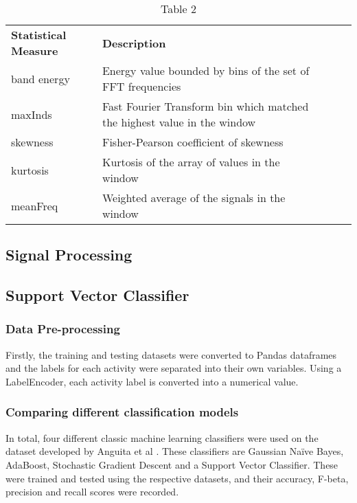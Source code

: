     \begin{table}[ht]
        \begin{tabular}{|l|l|lll}
            \cline{1-2}
            \textbf{Statistical Measure} & \textbf{Description} &  &  &  \\ \cline{1-2}
            band energy            & Energy value bounded by bins of the set of FFT frequencies           &  &  & \\ \cline{1-2}
            maxInds             & Fast Fourier Transform bin which matched the highest value in the window          &  &  &  \\ \cline{1-2}
            skewness            & Fisher-Pearson coefficient of skewness           &  &  &  \\ \cline{1-2}
            kurtosis               & Kurtosis of the array of values in the window           &  &  &  \\ \cline{1-2}
            meanFreq            & Weighted average of the signals in the window           &  &  &  \\ \cline{1-2}
        \end{tabular}
        \caption*{Table 2}
    \end{table}


\subsection{Signal Processing}

\subsection{Support Vector Classifier}
\subsubsection{Data Pre-processing}
    Firstly, the training and testing datasets were converted to Pandas dataframes and the labels for each activity were separated into their own variables.
    Using a LabelEncoder, each activity label is converted into a numerical value.

\subsubsection{Comparing different classification models}
    In total, four different classic machine learning classifiers were used on the dataset developed by Anguita et al \cite{Anguita2012}. These classifiers are Gaussian Naïve Bayes,
    AdaBoost, Stochastic Gradient Descent and a Support Vector Classifier. These were trained and tested using the respective datasets, and their accuracy,
    F-beta, precision and recall scores were recorded.

